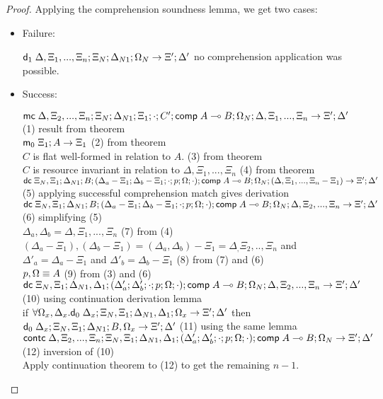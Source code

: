 \begin{proof}
   Applying the comprehension soundness lemma, we get two cases:
   
   \begin{itemize}
      \item Failure:
      
      $\mathsf{d}_1 \; \Delta, \Xi_1, ..., \Xi_n; \Xi_N; \Delta_{N1}; \Omega_N \rightarrow \Xi'; \Delta'$ \hfill no comprehension application was possible.
      
      \item Success:
      
      $\mathsf{mc} \; \Delta, \Xi_2, ..., \Xi_n; \Xi_N; \Delta_{N1}; \Xi_1; \cdot; C'; \mathsf{comp} \; A \multimap B; \Omega_N; \Delta, \Xi_1, ..., \Xi_n \rightarrow \Xi'; \Delta'$ \hfill (1) result from theorem \\
      $\mathsf{m}_0 \; \Xi_1; A \rightarrow \Xi_1$ \hfill (2) from theorem \\
      $C$ is flat well-formed in relation to $A$. \hfill (3) from theorem \\
      $C$ is resource invariant in relation to $\Delta, \Xi_1, ..., \Xi_n$ \hfill (4) from theorem \\
      
      $\mathsf{dc} \; \Xi_N, \Xi_1; \Delta_{N1}; B; (\Delta_a - \Xi_1; \Delta_b - \Xi_1; \cdot; p; \Omega; \cdot); \mathsf{comp} \; A \multimap B; \Omega_N; (\Delta, \Xi_1, ..., \Xi_n - \Xi_1) \rightarrow \Xi'; \Delta'$ \hfill (5) applying successful comprehension match gives derivation \\
      $\mathsf{dc} \; \Xi_N, \Xi_1; \Delta_{N1}; B; (\Delta_a - \Xi_1; \Delta_b - \Xi_1; \cdot; p; \Omega; \cdot); \mathsf{comp} \; A \multimap B; \Omega_N; \Delta, \Xi_2, ..., \Xi_n \rightarrow \Xi'; \Delta'$ \hfill (6) simplifying (5) \\
      $\Delta_a, \Delta_b = \Delta, \Xi_1, ..., \Xi_n$ \hfill (7) from (4) \\
      $(\Delta_a - \Xi_1), (\Delta_b - \Xi_1) = (\Delta_a, \Delta_b) - \Xi_1 = \Delta_, \Xi_2, .., \Xi_n$ and $\Delta'_a = \Delta_a - \Xi_1$ and $\Delta'_b = \Delta_b - \Xi_1$ \hfill (8) from (7) and (6) \\
      $p, \Omega \equiv A$ \hfill (9) from (3) and (6) \\
      $\mathsf{dc} \; \Xi_N, \Xi_1; \Delta_{N1}, \Delta_1; (\Delta'_a; \Delta'_b; \cdot; p; \Omega; \cdot); \mathsf{comp} \; A \multimap B; \Omega_N; \Delta, \Xi_2, ..., \Xi_n \rightarrow \Xi'; \Delta'$ \hfill (10) using continuation derivation lemma \\
      if $\forall \Omega_x, \Delta_x. \mathsf{d}_0 \; \Delta_x; \Xi_N, \Xi_1; \Delta_{N1}, \Delta_1; \Omega_x \rightarrow \Xi'; \Delta'$ then $\mathsf{d}_0 \; \Delta_x; \Xi_N, \Xi_1; \Delta_{N1}; B, \Omega_x \rightarrow \Xi'; \Delta'$ \hfill (11) using the same lemma \\ 
      $\mathsf{contc} \; \Delta, \Xi_2, ..., \Xi_n; \Xi_N, \Xi_1; \Delta_{N1}, \Delta_1; (\Delta'_a; \Delta'_b; \cdot; p; \Omega; \cdot); \mathsf{comp} \; A \multimap B; \Omega_N \rightarrow \Xi'; \Delta'$ \hfill (12) inversion of (10) \\
      Apply continuation theorem to (12) to get the remaining $n-1$.
   \end{itemize}
\end{proof}

